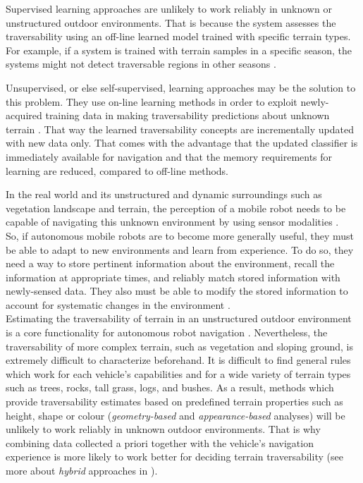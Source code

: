\documentclass[12pt,a4paper,table,dvipsnames,tikz]{report}
\newcommand{\term}{\textit}
\begin{document}
	Supervised learning approaches are unlikely to work reliably in unknown or 
	unstructured outdoor environments. That is because the system assesses the 
	traversability using an off-line learned model trained with specific 
	terrain types. For example, if a system is trained with terrain samples in a 
	specific season, the systems might not detect traversable regions in other 
	seasons \citep{Lee}.
	\par
	Unsupervised, or else self-supervised, learning approaches may be the solution 
	to this problem. They use on-line learning methods in order to exploit newly-
	acquired training data in making traversability predictions about unknown 
	terrain \citep{Kim}. That way the learned traversability concepts are 
	incrementally updated with new data only. That comes with the advantage that the 
	updated classifier is immediately available for navigation and that the memory 
	requirements for learning are reduced, compared to off-line methods.
	\par
	In the real world and its unstructured and dynamic surroundings such as vegetation 
	landscape and terrain, the perception of a mobile robot needs to be capable of 
	navigating this unknown environment by using sensor modalities \citep{Shabbir}.
	\\
	
	So, if autonomous mobile robots are to become more generally useful, they must 
	be able to adapt to new environments and learn from experience. To do so, they 
	need a way to store pertinent information about the environment, recall the 
	information at appropriate times, and reliably match stored information with 
	newly-sensed data. They also must be able to modify the stored information to 
	account for systematic changes in the environment \citep{Shneier}.
	\\
	
	Estimating the traversability of terrain in an unstructured outdoor 
	environment is a core functionality for autonomous robot navigation \citep{Kim}. 
	Nevertheless, the traversability of more complex terrain, such as 
	vegetation and sloping ground, is extremely difficult to characterize beforehand. 
	It is difficult to find general rules which work for each vehicle's	capabilities
	and for a wide variety of terrain types such as trees, rocks, tall grass, logs, 
	and bushes. As a result, methods which provide traversability estimates 
	based on predefined terrain properties such as height, shape or colour 
	(\term{geometry-based} and \term{appearance-based} analyses) will be unlikely to 
	work reliably in unknown outdoor environments. That is why combining data 
	collected a priori together with the vehicle’s navigation experience is more 
	likely to work better for deciding terrain traversability (see more about 
	\term{hybrid} approaches in \citet{Papadakis}).
	\\
	
\end{document}

